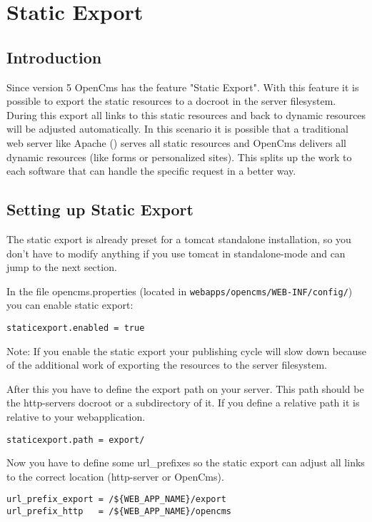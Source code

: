 \chapter{Static Export}

\section{Introduction}

Since version 5 OpenCms has the feature "Static Export". With this feature it is possible to export the static resources to a docroot in the server filesystem. During this export all links to this static resources and back to dynamic resources will be adjusted automatically. In this scenario it is possible that a traditional web server like Apache () serves all static resources and OpenCms delivers all dynamic resources (like forms or personalized sites). This splits up the work to each software that can handle the specific request in a better way.

\section{Setting up Static Export}

The static export is already preset for a tomcat standalone installation, so you don't have to modify anything if you use tomcat in standalone-mode and can jump to the next section.

In the file opencms.properties (located in \texttt{webapps/opencms/WEB-INF/config/}) you can enable static export:

\texttt{staticexport.enabled = true}

Note: If you enable the static export your publishing cycle will slow down because of the additional work of exporting the resources to the server filesystem.

After this you have to define the export path on your server. This path should be the http-servers docroot or a subdirectory of it. If you define a relative path it is relative to your webapplication.

\texttt{staticexport.path = export/}

Now you have to define some url\_prefixes so the static export can adjust all links to the correct location (http-server or OpenCms).

\begin{verbatim}
url_prefix_export = /${WEB_APP_NAME}/export
url_prefix_http   = /${WEB_APP_NAME}/opencms
\end{verbatim}

